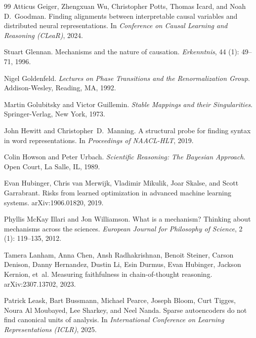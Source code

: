 \documentclass{article}
\begin{document}
\begin{thebibliography}{99}
Atticus Geiger, Zhengxuan Wu, Christopher Potts, Thomas Icard, and Noah D.\
  Goodman.
\newblock Finding alignments between interpretable causal variables and
  distributed neural representations.
\newblock In \emph{Conference on Causal Learning and Reasoning (CLeaR)}, 2024.

Stuart Glennan.
\newblock Mechanisms and the nature of causation.
\newblock \emph{Erkenntnis}, 44 (1): 49--71, 1996.

Nigel Goldenfeld.
\newblock \emph{Lectures on Phase Transitions and the Renormalization Group}.
\newblock Addison-Wesley, Reading, MA, 1992.

Martin Golubitsky and Victor Guillemin.
\newblock \emph{Stable Mappings and their Singularities}.
\newblock Springer-Verlag, New York, 1973.

John Hewitt and Christopher~D.\ Manning.
\newblock A structural probe for finding syntax in word representations.
\newblock In \emph{Proceedings of NAACL-HLT}, 2019.

Colin Howson and Peter Urbach.
\newblock \emph{Scientific Reasoning: The Bayesian Approach}.
\newblock Open Court, La Salle, IL, 1989.

Evan Hubinger, Chris van Merwijk, Vladimir Mikulik, Joar Skalse, and
  Scott Garrabrant.
\newblock Risks from learned optimization in advanced machine learning systems.
\newblock arXiv:1906.01820, 2019.

Phyllis McKay Illari and Jon Williamson.
\newblock What is a mechanism? Thinking about mechanisms across the sciences.
\newblock \emph{European Journal for Philosophy of Science},
  2 (1):\penalty0 119--135, 2012.

Tamera Lanham, Anna Chen, Ansh Radhakrishnan, Benoit Steiner, Carson Denison,
  Danny Hernandez, Dustin Li, Esin Durmus, Evan Hubinger, Jackson Kernion,
  et~al.
\newblock Measuring faithfulness in chain-of-thought reasoning.
\newblock arXiv:2307.13702, 2023.

Patrick Leask, Bart Bussmann, Michael Pearce, Joseph Bloom, Curt Tigges, Noura Al Moubayed, Lee Sharkey, and Neel Nanda.
\newblock Sparse autoencoders do not find canonical units of analysis.
\newblock In \emph{International Conference on Learning Representations
  (ICLR)}, 2025.


\end{thebibliography}
\end{document}
